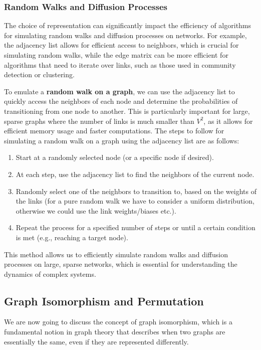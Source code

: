 \subsubsection{Random Walks and Diffusion Processes}

The choice of representation can significantly impact the efficiency of algorithms for simulating random walks and diffusion processes on networks. For example, the adjacency list allows for efficient access to neighbors, which is crucial for simulating random walks, while the edge matrix can be more efficient for algorithms that need to iterate over links, such as those used in community detection or clustering.

To emulate a \textbf{random walk on a graph}, we can use the adjacency list to quickly access the neighbors of each node and determine the probabilities of transitioning from one node to another. This is particularly important for large, sparse graphs where the number of links is much smaller than $V^2$, as it allows for efficient memory usage and faster computations. The steps to follow for simulating a random walk on a graph using the adjacency list are as follows:
\begin{enumerate}
    \item Start at a randomly selected node (or a specific node if desired).
    \item At each step, use the adjacency list to find the neighbors of the current node.
    \item Randomly select one of the neighbors to transition to, based on the weights of the links (for a pure random walk we have to consider a uniform distribution, otherwise we could use the link weights/biases etc.).
    \item Repeat the process for a specified number of steps or until a certain condition is met (e.g., reaching a target node).
\end{enumerate}
This method allows us to efficiently simulate random walks and diffusion processes on large, sparse networks, which is essential for understanding the dynamics of complex systems.

\subsection{Graph Isomorphism and Permutation}

We are now going to discuss the concept of graph isomorphism, which is a fundamental notion in graph theory that describes when two graphs are essentially the same, even if they are represented differently.

